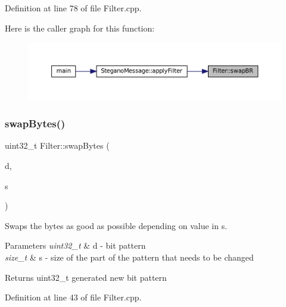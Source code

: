 Definition at line 78 of file Filter.\+cpp.

Here is the caller graph for this function\+:\nopagebreak
\begin{figure}[H]
\begin{center}
\leavevmode
\includegraphics[width=350pt]{classFilter_a51a2b1cce4671083d47530694d0e797e_icgraph}
\end{center}
\end{figure}
\mbox{\label{classFilter_a9d4f7bd12f0bfdf200abf53d166fd944}} 
\subsubsection{\texorpdfstring{swapBytes()}{swapBytes()}}
{\footnotesize\ttfamily uint32\+\_\+t Filter\+::swap\+Bytes (\begin{DoxyParamCaption}\item[{uint32\+\_\+t}]{d,  }\item[{size\+\_\+t}]{s }\end{DoxyParamCaption})\hspace{0.3cm}{\ttfamily [static]}}



Swaps the bytes as good as possible depending on value in s. 


\begin{DoxyParams}{Parameters}
{\em uint32\+\_\+t} & d -\/ bit pattern \\
\hline
{\em size\+\_\+t} & s -\/ size of the part of the pattern that needs to be changed \\
\hline
\end{DoxyParams}
\begin{DoxyReturn}{Returns}
uint32\+\_\+t generated new bit pattern 
\end{DoxyReturn}


Definition at line 43 of file Filter.\+cpp.

